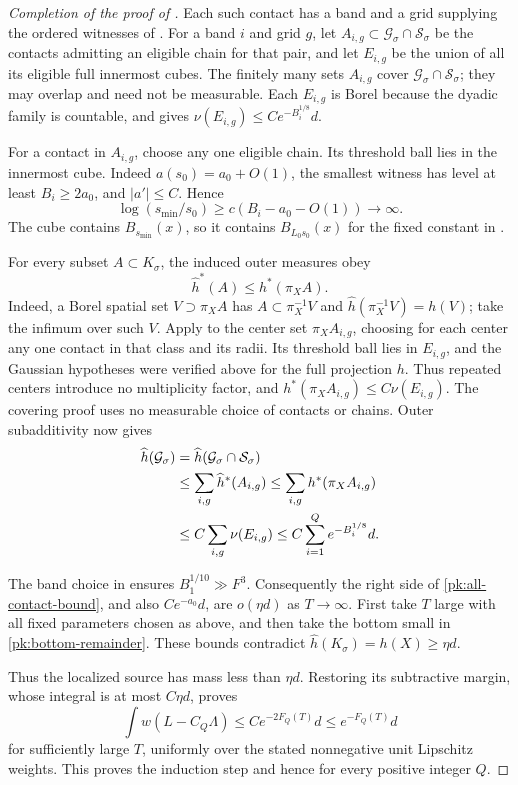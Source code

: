 \begin{proof}[Completion of the proof of ]
Each such contact has a band and a grid supplying the ordered
witnesses of . For a band $i$ and
grid $g$, let $A_{i,g}\subset\mathcal G_\sigma\cap\mathcal S_\sigma$
be the contacts admitting an eligible chain for that pair, and let
$E_{i,g}$ be the union of all its eligible full innermost cubes.
The finitely many sets $A_{i,g}$ cover
$\mathcal G_\sigma\cap\mathcal S_\sigma$; they may overlap and need
not be measurable. Each $E_{i,g}$ is Borel because the dyadic family
is countable, and  gives
$\nu(E_{i,g})\le C e^{-B_i^{1/8}}d$.

For a contact in $A_{i,g}$, choose any one eligible chain. Its
threshold ball lies in the innermost cube. Indeed
$a(s_0)=a_0+O(1)$, the smallest witness has level at least
$B_i\ge2a_0$, and $|a'|\le C$.
Hence
\[
 \log(s_{\min}/s_0)\ge c(B_i-a_0-O(1))\longrightarrow\infty.
\]
The cube contains $B_{s_{\min}}(x)$, so it contains
$B_{L_0s_0}(x)$ for the fixed constant in
.

For every subset $A\subset K_\sigma$, the induced outer measures obey
\[
 \widehat h^*(A)\le h^*(\pi_X A).
\]
Indeed, a Borel spatial set $V\supset\pi_X A$ has
$A\subset\pi_X^{-1}V$ and
$\widehat h(\pi_X^{-1}V)=h(V)$; take the infimum over such $V$.
Apply  to the center set $\pi_X A_{i,g}$,
choosing for each center any one contact in that class and its radii.
Its threshold ball lies in $E_{i,g}$, and the Gaussian hypotheses
were verified above for the full projection $h$. Thus repeated
centers introduce no multiplicity factor, and
$h^*(\pi_X A_{i,g})\le C\nu(E_{i,g})$. The covering proof uses no
measurable choice of contacts or chains. Outer subadditivity now gives
\begin{align}
 \widehat h(\mathcal G_\sigma)
 &=\widehat h(\mathcal G_\sigma\cap\mathcal S_\sigma)\notag\\
 &\le\sum_{i,g}\widehat h^*(A_{i,g})
 \le\sum_{i,g}h^*(\pi_X A_{i,g})\notag\\
 &\le C\sum_{i,g}\nu(E_{i,g})
 \le C\sum_{i=1}^Q e^{-B_i^{1/8}}d.
 \label{pk:all-contact-bound}
\end{align}

The band choice in  ensures
$B_1^{1/10}\gg F^3$.  Consequently the right side of
\eqref{pk:all-contact-bound}, and also $Ce^{-a_0}d$, are
$o(\eta d)$ as $T\to\infty$.  First take $T$ large with
all fixed parameters chosen as above, and then take the
bottom small in \eqref{pk:bottom-remainder}.  These bounds
contradict $\widehat h(K_\sigma)=h(X)\ge\eta d$.

Thus the localized source has mass less than $\eta d$.
Restoring its subtractive margin, whose integral is at most
$C\eta d$, proves
\[
 \int w(L-C_Q\Lambda)\le C e^{-2F_Q(T)}d
                       \le e^{-F_Q(T)}d
\]
for sufficiently large $T$, uniformly over the stated
nonnegative unit Lipschitz weights.  This proves the
induction step and hence  for every positive
integer $Q$.
\end{proof}
